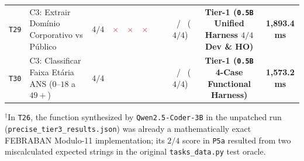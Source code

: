 \documentclass[10pt,a4paper]{article}
\newcommand{\cmark}{\textcolor{accent}{\textbf{\checkmark}}}
\newcommand{\xmark}{\textcolor{crimson}{$\times$}}
\begin{document}
\begin{table}[htbp]
{\begin{tabular}{llcccccclcc}
\texttt{T29} & C3: Extrair Dom\'inio Corporativo vs P\'ublico & $4/4$ & \xmark & \xmark & \xmark & \cmark & \cmark & \cmark\ / \cmark\ ($4/4$) & \textbf{Tier-1 (\texttt{0.5B} Unified Harness $4/4$ Dev \& HO)} & \textbf{1,893.4 ms} \\
\texttt{T30} & C3: Classificar Faixa Et\'aria ANS ($0\text{--}18$ a $49+$) & $4/4$ & \cmark & \cmark & \cmark & \cmark & \cmark & \cmark\ / \cmark\ ($4/4$) & \textbf{Tier-1 (\texttt{0.5B} 4-Case Functional Harness)} & \textbf{1,573.2 ms} \\
\bottomrule
\end{tabular}
}
\vspace{2pt}
{\footnotesize $^\dagger$In \texttt{T26}, the function synthesized by \texttt{Qwen2.5-Coder-3B} in the unpatched run (\texttt{precise\_tier3\_results.json}) was already a mathematically exact FEBRABAN Modulo-11 implementation; its $2/4$ score in \texttt{P5a} resulted from two miscalculated expected strings in the original \texttt{tasks\_data.py} test oracle.}
\end{table}
\end{document}
